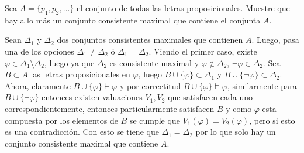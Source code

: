 \begin{prob}[Bonus]
    Sea \(A=\{p_1,p_2,...\}\) el conjunto de todas las letras proposicionales. Muestre que hay a lo más un conjunto consistente maximal que contiene el conjunta \(A\).
\end{prob}

\begin{sol}
    Sean \(\Delta_1\) y \(\Delta_2\) dos conjuntos consistentes maximales que contienen \(A\). Luego, pasa una de los opciones \(\Delta_1\neq\Delta_2\) ó \(\Delta_1=\Delta_2\). Viendo el primer caso, existe \(\varphi\in\Delta_1\setminus\Delta_2\), luego ya que \(\Delta_2\) es consistente maximal y \(\varphi\notin\Delta_2\), \(\neg\varphi\in\Delta_2\). Sea \(B\subset A\) las letras proposicionales en \(\varphi\), luego \(B\cup\{\varphi\}\subset\Delta_1\) y \(B\cup\{\neg\varphi\}\subset\Delta_2\). Ahora, claramente \(B\cup\{\varphi\}\vdash\varphi\) y por correctitud \(B\cup\{\varphi\}\models\varphi\), similarmente para \(B\cup\{\neg\varphi\}\) entonces existen valuaciones \(V_1,V_2\) que satisfacen cada uno correspondientemente, entonces particularmente satisfacen \(B\) y como \(\varphi\) esta compuesta por los elementos de \(B\) se cumple que \(V_1(\varphi)=V_2(\varphi)\), pero si esto es una contradicción. Con esto se tiene que \(\Delta_1=\Delta_2\) por lo que solo hay un conjunto consistente maximal que contiene \(A\).
\end{sol}




